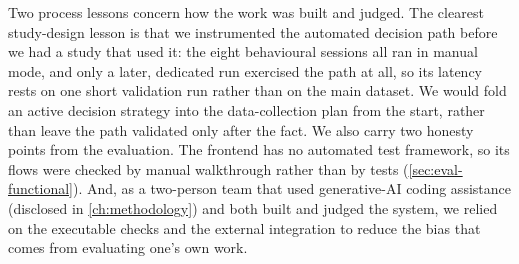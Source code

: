 Two process lessons concern how the work was built and judged.
The clearest study-design lesson is that we instrumented the automated decision path before we had a study that used it: the eight behavioural sessions all ran in manual mode, and only a later, dedicated run exercised the path at all, so its latency rests on one short validation run rather than on the main dataset.
We would fold an active decision strategy into the data-collection plan from the start, rather than leave the path validated only after the fact.
We also carry two honesty points from the evaluation.
The frontend has no automated test framework, so its flows were checked by manual walkthrough rather than by tests (\cref{sec:eval-functional}).
And, as a two-person team that used generative-AI coding assistance (disclosed in \cref{ch:methodology}) and both built and judged the system, we relied on the executable checks and the external integration to reduce the bias that comes from evaluating one's own work.

